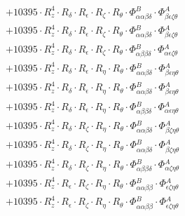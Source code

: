 \documentclass{article}
\begin{document}
\begin{subequations}
\begin{gather}
\begin{array}{c}
 \\[0.2em] 		 + 10395 \cdot R_{z}^{4} \cdot R_{\delta{}} \cdot R_{\epsilon{}} \cdot R_{\zeta{}} \cdot R_{\theta{}} \cdot \Phi{}^{B}_{\alpha{}\alpha{}\beta{}\delta{}} \cdot \Phi{}^{A}_{\beta{}\epsilon{}\zeta{}\theta{}} 
 \\[0.2em] 		 + 10395 \cdot R_{z}^{4} \cdot R_{\delta{}} \cdot R_{\epsilon{}} \cdot R_{\zeta{}} \cdot R_{\theta{}} \cdot \Phi{}^{B}_{\alpha{}\alpha{}\beta{}\delta{}} \cdot \Phi{}^{A}_{\beta{}\epsilon{}\zeta{}\theta{}} 
 \\[0.2em] 		 + 10395 \cdot R_{z}^{4} \cdot R_{\delta{}} \cdot R_{\epsilon{}} \cdot R_{\zeta{}} \cdot R_{\theta{}} \cdot \Phi{}^{B}_{\alpha{}\beta{}\beta{}\delta{}} \cdot \Phi{}^{A}_{\alpha{}\epsilon{}\zeta{}\theta{}} 
 \\[0.2em] 		 + 10395 \cdot R_{z}^{4} \cdot R_{\delta{}} \cdot R_{\epsilon{}} \cdot R_{\eta{}} \cdot R_{\theta{}} \cdot \Phi{}^{B}_{\alpha{}\alpha{}\beta{}\delta{}} \cdot \Phi{}^{A}_{\beta{}\epsilon{}\eta{}\theta{}} 
 \\[0.2em] 		 + 10395 \cdot R_{z}^{4} \cdot R_{\delta{}} \cdot R_{\epsilon{}} \cdot R_{\eta{}} \cdot R_{\theta{}} \cdot \Phi{}^{B}_{\alpha{}\alpha{}\beta{}\delta{}} \cdot \Phi{}^{A}_{\beta{}\epsilon{}\eta{}\theta{}} 
 \\[0.2em] 		 + 10395 \cdot R_{z}^{4} \cdot R_{\delta{}} \cdot R_{\epsilon{}} \cdot R_{\eta{}} \cdot R_{\theta{}} \cdot \Phi{}^{B}_{\alpha{}\beta{}\beta{}\delta{}} \cdot \Phi{}^{A}_{\alpha{}\epsilon{}\eta{}\theta{}} 
 \\[0.2em] 		 + 10395 \cdot R_{z}^{4} \cdot R_{\delta{}} \cdot R_{\zeta{}} \cdot R_{\eta{}} \cdot R_{\theta{}} \cdot \Phi{}^{B}_{\alpha{}\alpha{}\beta{}\delta{}} \cdot \Phi{}^{A}_{\beta{}\zeta{}\eta{}\theta{}} 
 \\[0.2em] 		 + 10395 \cdot R_{z}^{4} \cdot R_{\delta{}} \cdot R_{\zeta{}} \cdot R_{\eta{}} \cdot R_{\theta{}} \cdot \Phi{}^{B}_{\alpha{}\alpha{}\beta{}\delta{}} \cdot \Phi{}^{A}_{\beta{}\zeta{}\eta{}\theta{}} 
 \\[0.2em] 		 + 10395 \cdot R_{z}^{4} \cdot R_{\delta{}} \cdot R_{\zeta{}} \cdot R_{\eta{}} \cdot R_{\theta{}} \cdot \Phi{}^{B}_{\alpha{}\beta{}\beta{}\delta{}} \cdot \Phi{}^{A}_{\alpha{}\zeta{}\eta{}\theta{}} 
 \\[0.2em] 		 + 10395 \cdot R_{z}^{4} \cdot R_{\epsilon{}} \cdot R_{\zeta{}} \cdot R_{\eta{}} \cdot R_{\theta{}} \cdot \Phi{}^{B}_{\alpha{}\alpha{}\beta{}\beta{}} \cdot \Phi{}^{A}_{\epsilon{}\zeta{}\eta{}\theta{}} 
 \\[0.2em] 		 + 10395 \cdot R_{z}^{4} \cdot R_{\epsilon{}} \cdot R_{\zeta{}} \cdot R_{\eta{}} \cdot R_{\theta{}} \cdot \Phi{}^{B}_{\alpha{}\alpha{}\beta{}\beta{}} \cdot \Phi{}^{A}_{\epsilon{}\zeta{}\eta{}\theta{}} 

\end{array}
\end{gather}
\end{subequations}
\end{document}
